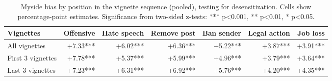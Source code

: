 \begin{table}

\caption{\label{tab:robustness-vignette-order}Myside bias by position in the vignette sequence (pooled), testing for desensitization. Cells show percentage-point estimates. Significance from two-sided z-tests: *** p<0.001, ** p<0.01, * p<0.05.}
\centering
\begin{tabular}[t]{lrrrrrr}
\toprule
\textbf{Vignettes} & \textbf{Offensive} & \textbf{Hate speech} & \textbf{Remove post} & \textbf{Ban sender} & \textbf{Legal action} & \textbf{Job loss}\\
\midrule
All vignettes & +7.33*** & +6.02*** & +6.36*** & +5.22*** & +3.87*** & +3.91***\\
First 3 vignettes & +7.78*** & +5.37*** & +5.99*** & +4.96*** & +3.79*** & +3.64***\\
Last 3 vignettes & +7.23*** & +6.31*** & +6.92*** & +5.76*** & +4.20*** & +4.35***\\
\bottomrule
\end{tabular}
\end{table}

